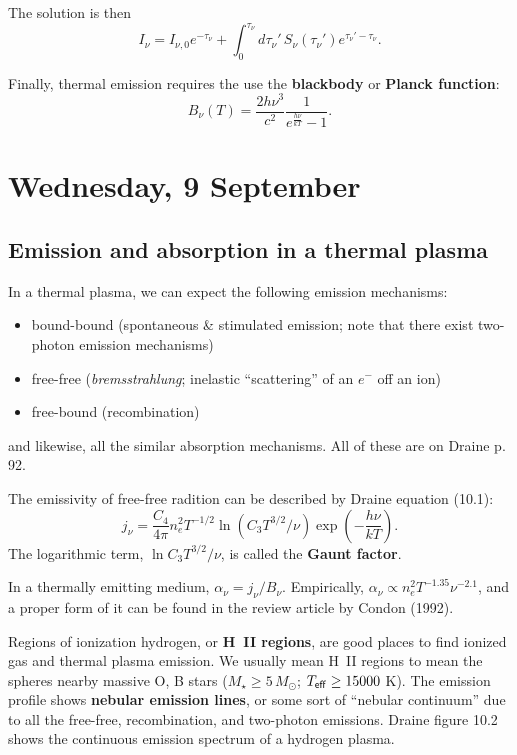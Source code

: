 \documentclass{tufte-handout}
\renewcommand{\textbf}[1]{{\bf \textcolor{dark-gray}{#1}}}
\renewcommand{\rm}{\sf}
\newcommand{\HII}{\textnormal{H{\smaller~\textsc{II}}}}
\begin{document}
The solution is then
\begin{equation}
I_\nu = I_{\nu, 0} e^{-\tau_\nu} + \int_0^{\tau_\nu} d\tau_\nu'\, S_\nu (\tau_\nu') e^{\tau_\nu' - \tau_\nu}.
\end{equation}


Finally, thermal emission requires the use the \textbf{blackbody} or \textbf{Planck function}:
\begin{equation}
B_\nu(T) = \frac{2h \nu^3}{c^2}\frac{1}{e^{\frac{h\nu}{kT}} - 1}.
\end{equation}


\section{Wednesday, 9 September}

\subsection{Emission and absorption in a thermal plasma}

In a thermal plasma, we can expect the following emission mechanisms:
\begin{itemize}
\item bound-bound (spontaneous \& stimulated emission; note that there exist two-photon emission mechanisms)
\item free-free (\textit{bremsstrahlung}; inelastic ``scattering'' of an $e^-$ off an ion)
\item free-bound (recombination)
\end{itemize}
and likewise, all the similar absorption mechanisms. All of these are on Draine p. 92.

The emissivity of free-free radition can be described by Draine equation (10.1):
\begin{equation}
j_\nu = \frac{C_4}{4\pi} n_e^2 T^{-1/2} \ln\left (C_3 T^{3/2}/\nu\right ) \exp\left (-\frac{h\nu}{kT}\right ).
\end{equation}
The logarithmic term, $\ln C_3 T^{3/2}/\nu$, is called the \textbf{Gaunt factor}.

In a thermally emitting medium, $\alpha_\nu = j_\nu /B_\nu$. Empirically, $\alpha_\nu \propto n_e^2 T^{-1.35} \nu^{-2.1}$, and a proper form of it can be found in the review article by Condon (1992).

Regions of ionization hydrogen, or \textbf{\HII{} regions}, are good places to find ionized gas and thermal plasma emission. We usually mean \HII{} regions to mean the spheres nearby massive O, B stars ($M_\star \geq 5\, M_\odot$; $T_{\rm eff} \geq 15000$ K). The emission profile shows \textbf{nebular emission lines}, or some sort of ``nebular continuum'' due to all the free-free, recombination, and two-photon emissions. Draine figure 10.2 shows the continuous emission spectrum of a hydrogen plasma.
\end{document}
